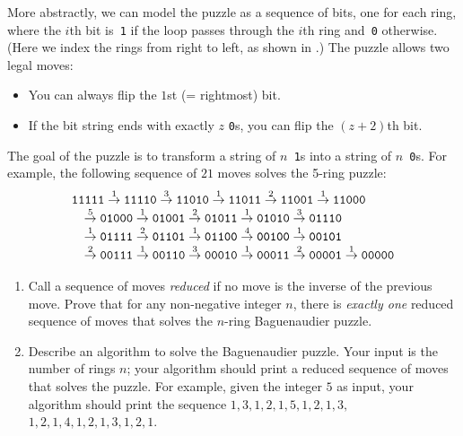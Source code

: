 \begin{exercises}
\begin{enumerate}[label=\arabic*.,ref=\thechapter.\arabic*,leftmargin=*,align=left,itemsep=1.5ex plus 0.5ex]
More abstractly, we can model the puzzle as a sequence of bits, one for each ring, where the $i$th bit is\texttt{ 1} if the loop passes through the $i$th ring and\texttt{ 0} otherwise. (Here we index the rings from right to left, as shown in .) The puzzle allows two legal moves:
\begin{itemize}
\item You can always flip the $1$st (= rightmost) bit.
\item If the bit string ends with exactly $z$ \texttt{0}s, you can flip the $(z + 2)$th bit.
\end{itemize}
The goal of the puzzle is to transform a string of $n$\texttt{ 1}s into a string of $n$\texttt{ 0}s. For example, the following sequence of $21$ moves solves the 5-ring puzzle:
\[
\begin{array}{l}
\mbox{\texttt{11111}} \stackrel{1}{\to} \mbox{\texttt{11110}} \stackrel{3}{\to} \mbox{\texttt{11010}} \stackrel{1}{\to} \mbox{\texttt{11011}} \stackrel{2}{\to} \mbox{\texttt{11001}} \stackrel{1}{\to} \mbox{\texttt{11000}}\\
\quad \stackrel{5}{\to} \mbox{\texttt{01000}} \stackrel{1}{\to} \mbox{\texttt{01001}} \stackrel{2}{\to} \mbox{\texttt{01011}} \stackrel{1}{\to} \mbox{\texttt{01010}} \stackrel{3}{\to} \mbox{\texttt{01110}}\\
\quad \stackrel{1}{\to} \mbox{\texttt{01111}} \stackrel{2}{\to} \mbox{\texttt{01101}} \stackrel{1}{\to} \mbox{\texttt{01100}} \stackrel{4}{\to} \mbox{\texttt{00100}} \stackrel{1}{\to} \mbox{\texttt{00101}}\\
\quad \stackrel{2}{\to} \mbox{\texttt{00111}} \stackrel{1}{\to} \mbox{\texttt{00110}} \stackrel{3}{\to} \mbox{\texttt{00010}} \stackrel{1}{\to} \mbox{\texttt{00011}} \stackrel{2}{\to} \mbox{\texttt{00001}} \stackrel{1}{\to} \mbox{\texttt{00000}}
\end{array}
\]
\begin{enumerate}
\item {} Call a sequence of moves \emph{reduced} if no move is the inverse of the previous move. Prove that for any non-negative integer $n$, there is \emph{exactly one} reduced sequence of moves that solves the $n$-ring Baguenaudier puzzle. 
\item Describe an algorithm to solve the Baguenaudier puzzle. Your input is the number of rings $n$; your algorithm should print a reduced sequence of moves that solves the puzzle. For example, given the integer $5$ as input, your algorithm should print the sequence $1,3,1,2,1,5,1,2,1,3,$ $1,2,1,4,1,2,1,3,1,2,1$.

\end{enumerate}
\end{enumerate}
\end{exercises}
